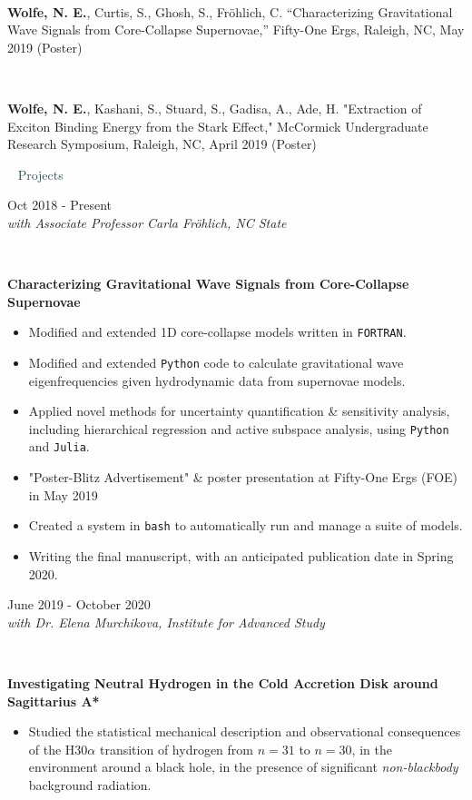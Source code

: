 \documentclass[7.5pt]{article}
\def \secondarycolor {darkslategray}
\def \tertiarycolor  {airforceblue} %
\def \leftcolwidth{3.10cm}
\def\code#1{\texttt{#1}}
\newcommand{\cvsubtitle}[1]{
    \hspace{\leftcolwidth} \ \textcolor{\secondarycolor}{ \large{{#1}} }
}
\newcommand{\cventry}[4]{
    \begin{minipage}[t]{\leftcolwidth} 
        \small{
            \begin{flushright}
                #2\\
                \textcolor{\tertiarycolor}{\textit{#4}}
            \end{flushright}
        }
    \end{minipage} \ \
    \begin{minipage}[t]{\linewidth-\leftcolwidth} \normalsize{\textbf{#1} \\ #3} \end{minipage}
} %
\newcommand{\cventrysingle}[3]{
    \begin{minipage}[t]{\leftcolwidth} \small{#2 \begin{flushleft}\textcolor{\tertiarycolor}{\textit{#3}} \end{flushleft} } 
    \end{minipage} \ \
    \begin{minipage}[t]{\linewidth-\leftcolwidth} \normalsize{{#1}} \end{minipage}
}
\begin{document}
\cventrysingle{\textbf{Wolfe, N. E.}, Curtis, S., Ghosh, S., Fr\"ohlich, C. “Characterizing Gravitational Wave Signals from Core-Collapse Supernovae,” Fifty-One Ergs, Raleigh, NC, May 2019 (Poster)}{}{}

\cventrysingle{\textbf{Wolfe, N. E.}, Kashani, S., Stuard, S., Gadisa, A., Ade, H. "Extraction of Exciton Binding Energy from the Stark Effect," McCormick Undergraduate Research Symposium, Raleigh, NC, April 2019 (Poster)}{}{}
\fi 

\cvsubtitle{Projects}

\cventry{Characterizing Gravitational Wave Signals from Core-Collapse Supernovae}{Oct 2018 - Present}
{\vspace*{-2.5mm} \begin{itemize}
        \item{Modified and extended 1D core-collapse models written in \code{FORTRAN}.}
        \item{Modified and extended \code{Python} code to calculate gravitational wave eigenfrequencies given hydrodynamic data from supernovae models.}%
        \item{Applied novel methods for uncertainty quantification \& sensitivity analysis, including hierarchical regression and active subspace analysis, using \code{Python} and \code{Julia}.}
        \item{"Poster-Blitz Advertisement" \& poster presentation at Fifty-One Ergs (FOE) in May 2019}
        \item{Created a system in \code{bash} to automatically run and manage a suite of models.}
        \item{Writing the final manuscript, with an anticipated publication date in Spring 2020.}
    \end{itemize}
}{with Associate Professor Carla Fr\"ohlich, NC State}

\cventry{Investigating Neutral Hydrogen in the Cold Accretion Disk around Sagittarius A*}{June 2019 - October 2020}{\vspace*{-3.5mm} \begin{itemize}
    \item Studied the statistical mechanical description and observational consequences of the $\mathrm{H}30\alpha$ transition of hydrogen from $n = 31$ to $n = 30$, in the environment around a black hole, in the presence of significant \textit{non-blackbody} background radiation.
\end{itemize}}{with Dr. Elena Murchikova, Institute for Advanced Study}
\end{document}
